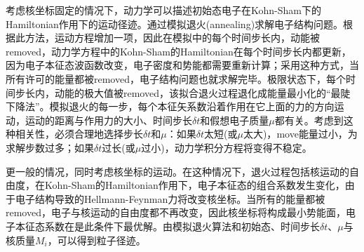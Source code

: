 考虑核坐标固定的情况下，动力学可以描述初始态电子在\textrm{Kohn-Sham}下的\textrm{Hamiltonian}作用下的运动径迹。通过模拟退火\textrm{(annealing)}求解电子结构问题。根据此方法，运动方程增加一项，因此在模拟中的每个时间步长内，动能被\textrm{removed}，动力学方程中的\textrm{Kohn-Sham}的\textrm{Hamiltonian}在每个时间步长内都更新，因为电子本征态波函数改变，电子密度和势能都需要重新计算；采用这种方式，当所有许可的能量都被\textrm{removed}，电子结构问题也就求解完毕。极限状态下，每个时间步长内，动能的极大值被\textrm{removed}，该拟合退火过程退化成能量最小化的“最陡下降法”。模拟退火的每一步，每个本征矢系数沿着作用在它上面的力的方向运动，运动的距离与作用力的大小、时间步长$\delta t$和假想电子质量$\mu$都有关。考虑到这种相关性，必须合理地选择步长$\delta t$和$\mu$：如果$\delta t$太短(或$\mu$太大)，\textrm{move}能量过小，为求解步数过多；如果$\delta t$过长(或$\mu$过小)，动力学积分方程将变得不稳定。

更一般的情况，同时考虑核坐标的运动。在这种情况下，退火过程包括核运动的自由度，在\textrm{Kohn-Sham}的\textrm{Hamiltonian}作用下，电子本征态的组合系数发生变化，由于电子结构导致的\textrm{Hellmann-Feynman}力将改变核坐标。当所有的能量都被\textrm{removed}，电子与核运动的自由度都不再改变，因此核坐标将构成最小势能面，电子本征态系数在是此条件下最优解。由模拟退火算法和初始态、时间步长$\delta t$、$\mu$与核质量$M_i$，可以得到粒子径迹。
